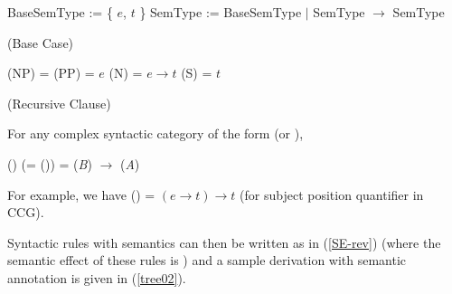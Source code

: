 \documentclass[output=paper]{langsci/langscibook}
\begin{document}
\begin{exe}
 \ex\label{semtyp-def}
  \begin{xlist}
 \ex
    BaseSemType := \{ $e$, $t$ \}
 \ex
    SemType := BaseSemType $|$ SemType \ensuremath{ \rightarrow } SemType
  \end{xlist}
 \ex\label{semtyp-base}
  (Base Case)
  \begin{xlist}
 \ex\label{semtyp-np}
    \SemTyp(NP) = \SemTyp(PP) = $e$
 \ex\label{semtyp-np}
    \SemTyp(N) = $e \ensuremath{ \rightarrow } t$
 \ex\label{semtyp-s}
    \SemTyp(S) = $t$
  \end{xlist}
 \ex\label{semtyp-recur}
  (Recursive Clause)
  
  For any complex syntactic category of the form
      (or ), 
  
     \SemTyp()
     (= \SemTyp()) =
     \SemTyp(\textit{B}) \ensuremath{ \rightarrow } \SemTyp(\textit{A})
\end{exe}
For example, we have \SemTyp() =  $(e \ensuremath{ \rightarrow } t) \ensuremath{ \rightarrow } t$
(for subject position quantifier in CCG).

Syntactic rules with semantics can then be written as in (\ref{SE-rev})
(where the semantic effect of these rules is )
and a sample derivation with semantic annotation is given in (\ref{tree02}).
\end{document}
